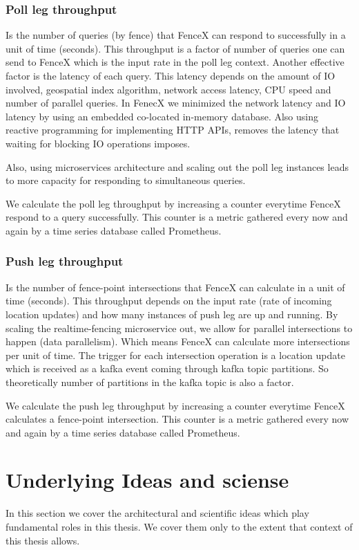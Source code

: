 \documentclass[a4]{report}
\begin{document}
    \subsubsection{Poll leg throughput}
    Is the number of queries (by fence) that FenceX can respond to successfully in a unit of time (seconds).
    This throughput is a factor of number of queries one can send to FenceX which is the input rate in the poll leg
    context.
    Another effective factor is the latency of each query.
    This latency depends on the amount of IO involved, geospatial index algorithm, network access latency, CPU speed
    and number of parallel queries.
    In FenecX we minimized the network latency and IO latency by using an embedded co-located in-memory database.
    Also using reactive programming for implementing HTTP APIs, removes the latency that waiting for blocking IO
    operations imposes.

    Also, using microservices architecture and scaling out the poll leg instances leads to more capacity for responding
    to simultaneous queries.

    We calculate the poll leg throughput by increasing a counter everytime FenceX respond to a query successfully.
    This counter is a metric gathered every now and again by a time series database called Prometheus.

    \subsubsection{Push leg throughput}
    Is the number of fence-point intersections that FenceX can calculate in a unit of time (seconds).
    This throughput depends on the input rate (rate of incoming location updates) and how many instances of push leg
    are up and running.
    By scaling the realtime-fencing microservice out, we allow for parallel intersections to happen (data parallelism).
    Which means FenceX can calculate more intersections per unit of time.
    The trigger for each intersection operation is a location update which is received as a kafka event coming through
    kafka topic partitions.
    So theoretically number of partitions in the kafka topic is also a factor.

    We calculate the push leg throughput by increasing a counter everytime FenceX calculates a fence-point intersection.
    This counter is a metric gathered every now and again by a time series database called Prometheus.


    \section{Underlying Ideas and sciense}
    In this section we cover the architectural and scientific ideas which play fundamental roles in this thesis.
    We cover them only to the extent that context of this thesis allows.
\end{document}
